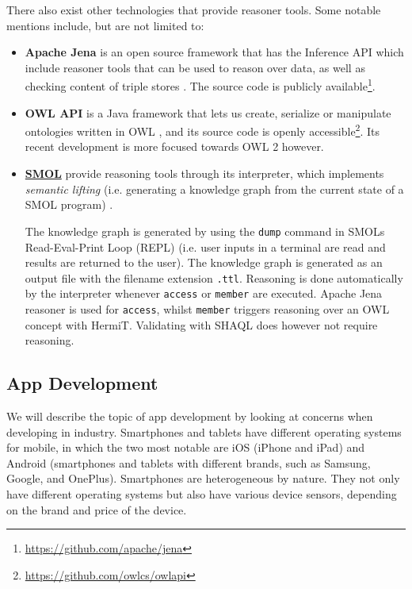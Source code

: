 \documentclass{article}
\begin{document}
There also exist other technologies that provide reasoner tools. Some notable mentions include, but are not limited to:
\begin{itemize}
    \item{\textbf{Apache Jena}} is an open source framework that has the Inference API which include reasoner tools that can be used to reason over data, as well as checking content of triple stores \cite{noauthor_apache_nodate-1}. The source code is publicly available\footnote{\url{https://github.com/apache/jena}}.
    \item{\textbf{OWL API}} is a Java framework that lets us create, serialize or manipulate ontologies written in OWL \cite{noauthor_owl_nodate}, and its source code is openly accessible\footnote{\url{https://github.com/owlcs/owlapi}}. Its recent development is more focused towards OWL 2 however.
    \item\hyperref[subsec:SMOL]{\textbf{SMOL}} provide reasoning tools through its interpreter, which implements \emph{semantic lifting} (i.e. generating a knowledge graph from the current state of a SMOL program) \cite{noauthor_semantic_nodate}. 
    
    The knowledge graph is generated by using the \verb|dump| command in SMOLs Read-Eval-Print Loop (REPL) (i.e. user inputs in a terminal are read and results are returned to the user). The knowledge graph is generated as an output file with the filename extension \verb|.ttl|. Reasoning is done automatically by the interpreter whenever \verb|access| or \verb|member| are executed. Apache Jena reasoner is used for \verb|access|, whilst \verb|member| triggers reasoning over an OWL concept with HermiT. Validating with SHAQL does however not require reasoning.
\end{itemize}



\subsection{App Development}\label{subsec:AppDevelopment}
We will describe the topic of app development by looking at concerns when developing in industry. Smartphones and tablets have different operating systems for mobile, in which the two most notable are iOS (iPhone and iPad) and Android (smartphones and tablets with different brands, such as Samsung, Google, and OnePlus). Smartphones are heterogeneous by nature. They not only have different operating systems but also have various device sensors, depending on the brand and price of the device. 
\end{document}
